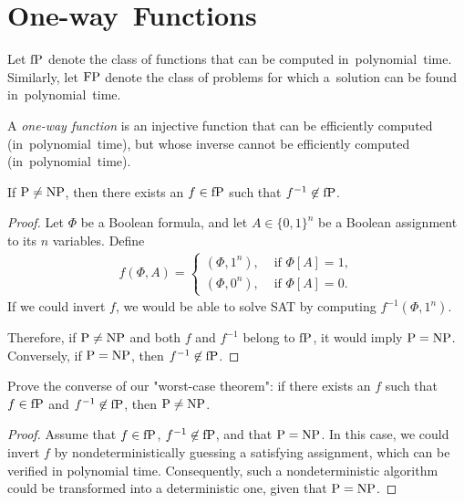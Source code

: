 
\section{One-way~Functions}\label{sec:one_way_functions}

Let $\operatorname{fP}$ denote the class of functions that can be computed in~polynomial~time.
Similarly, let $\operatorname{FP}$ denote the class of problems for which a~solution can be found in~polynomial~time.

\begin{definition}
	A \emph{one-way function} is an injective function that can be efficiently computed (in~polynomial~time), but whose inverse cannot be efficiently computed (in~polynomial~time).
\end{definition}

\begin{theorem}
    If $\operatorname{P} \neq \operatorname{NP}$, then there exists an $f \in \operatorname{fP}$ such that $f^{-1} \not\in \operatorname{fP}$.
\end{theorem}

\begin{proof}
    Let $\Phi$ be a Boolean formula, and let $A \in \{0, 1\}^n$ be a Boolean assignment to its $n$ variables.
    Define
    \begin{align*}
        f(\Phi, A) = \begin{cases}
        (\Phi, 1^n), &\text{ if } \Phi[A]=1, \\
        (\Phi, 0^n), &\text{ if } \Phi[A]=0.
        \end{cases}
    \end{align*}
    If we could invert $f$, we would be able to solve SAT by computing $f^{-1}(\Phi, 1^n)$.

    Therefore, if $\operatorname{P} \neq \operatorname{NP}$ and both $f$ and $f^{-1}$ belong to $\operatorname{fP}$, it would imply $\operatorname{P} = \operatorname{NP}$.
    Conversely, if $\operatorname{P} = \operatorname{NP}$, then $f^{-1} \not\in \operatorname{fP}$.
\end{proof}

\begin{exercise}
	Prove the converse of our "worst-case theorem": if there exists an $f$ such that $f \in  \operatorname{fP}$ and $f^{-1} \not\in \operatorname{fP}$, then $\operatorname{P} \neq \operatorname{NP}$.
\end{exercise}

\begin{proof}
	Assume that $f \in  \operatorname{fP}$, $f^{-1} \not\in  \operatorname{fP}$, and that $\operatorname{P} = \operatorname{NP}$.
	In this case, we could invert $f$ by nondeterministically guessing a satisfying assignment, which can be verified in polynomial time.
	Consequently, such a nondeterministic algorithm could be transformed into a deterministic one, given that $\operatorname{P} = \operatorname{NP}$.
\end{proof}

